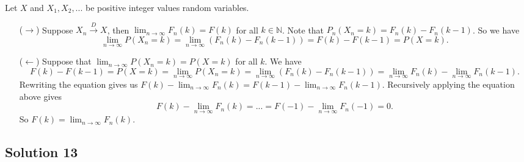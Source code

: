 Let $X$ and $X_1, X_2, ...$ be positive integer values random variables.
\begin{itemize}
    \item[($\rightarrow$)] Suppose $X_n \xrightarrow{D} X$, then $\lim_{n \to \infty} F_n(k) = F(k)$ for all $k \in \mathbb{N}$.
        Note that $P_n(X_n = k) = F_n(k) - F_n(k - 1)$.
        So we have
        \begin{equation*}
            \lim_{n \to \infty} P(X_n = k) = \lim_{n \to \infty} (F_n(k) - F_n(k - 1))
                = F(k) - F(k - 1)
                = P(X = k).
        \end{equation*}
    \item[($\leftarrow$)] Suppose that $\lim_{n \to \infty} P(X_n = k) = P(X = k)$ for all $k$.
        We have
        \begin{equation*}
            F(k) - F(k - 1) = P(X = k)
                = \lim_{n \to \infty} P(X_n = k)
                = \lim_{n \to \infty} (F_n(k) - F_n(k - 1))
                = \lim_{n \to \infty} F_n(k) - \lim_{n \to \infty} F_n(k - 1).
        \end{equation*}
        Rewriting the equation gives us $F(k) - \lim_{n \to \infty} F_n(k) = F(k - 1) - \lim_{n \to \infty} F_n(k - 1)$.
        Recursively applying the equation above gives
        \begin{equation*}
            F(k) - \lim_{n \to \infty} F_n(k) = ...
                = F(-1) - \lim_{n \to \infty} F_n(-1)
                = 0.
        \end{equation*}
        So $F(k) = \lim_{n \to \infty} F_n(k)$.
\end{itemize}


\subsection*{Solution 13}

